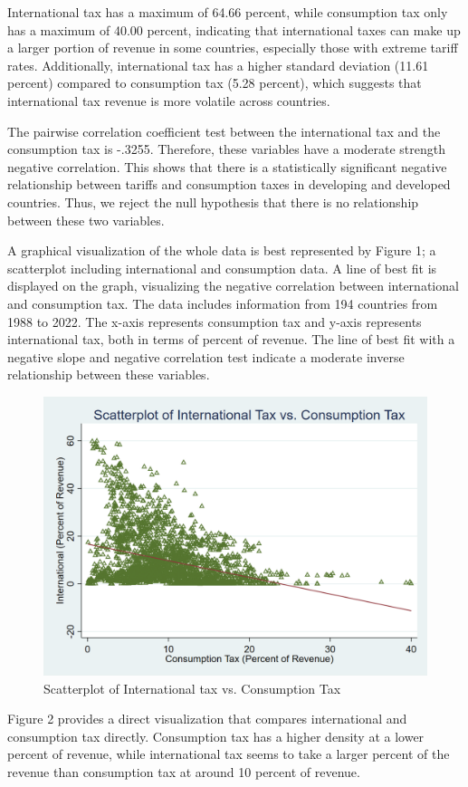 \documentclass[12pt]{article}
\begin{document}
International tax has a maximum of 64.66 percent, while consumption tax only has a maximum of 40.00 percent, indicating that international taxes can make up a larger portion of revenue in some countries, especially those with extreme tariff rates. Additionally, international tax has a higher standard deviation (11.61 percent) compared to consumption tax (5.28 percent), which suggests that international tax revenue is more volatile across countries.

The pairwise correlation coefficient test between the international tax and the consumption tax is -.3255. Therefore, these variables have a moderate strength negative correlation. This shows that there is a statistically significant negative relationship between tariffs and consumption taxes in developing and developed countries. Thus, we reject the null hypothesis that there is no relationship between these two variables. 

A graphical visualization of the whole data is best represented by Figure 1; a scatterplot including international and consumption data. A line of best fit is displayed on the graph, visualizing the negative correlation between international and consumption tax. The data includes information from 194 countries from 1988 to 2022. The x-axis represents consumption tax and y-axis represents international tax, both in terms of percent of revenue. The line of best fit with a negative slope and negative correlation test indicate a moderate inverse relationship between these variables. 

\begin{figure}[h]
    \centering
    \includegraphics[width=0.5\linewidth]{Reproducibility_Package//png_files/Scatterplotintvscons.png}
    \caption{Scatterplot of International tax vs. Consumption Tax}
    \label{fig:enter-label}
\end{figure}

Figure 2 provides a direct visualization that compares international and consumption tax directly. Consumption tax has a higher density at a lower percent of revenue, while international tax seems to take a larger percent of the revenue than consumption tax at around 10 percent of revenue. 
\end{document}
